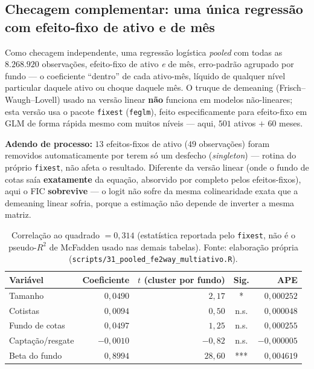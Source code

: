 \documentclass[11pt,a4paper]{article}
\begin{document}
\subsection{Checagem complementar: uma única regressão com efeito-fixo de ativo e de mês}

Como checagem independente, uma regressão logística \emph{pooled} com todas as $8.268.920$
observações, efeito-fixo de ativo \emph{e} de mês, erro-padrão agrupado por fundo --- o
coeficiente ``dentro'' de cada ativo-mês, líquido de qualquer nível particular daquele ativo ou
choque daquele mês. O truque de demeaning (Frisch--Waugh--Lovell) usado na versão linear
\textbf{não} funciona em modelos não-lineares; esta versão usa o pacote \texttt{fixest}
(\texttt{feglm}), feito especificamente para efeito-fixo em GLM de forma rápida mesmo com muitos
níveis --- aqui, $501$ ativos $+$ $60$ meses.

\textbf{Adendo de processo:} $13$ efeitos-fixos de ativo ($49$ observações) foram removidos
automaticamente por terem só um desfecho (\emph{singleton}) --- rotina do próprio
\texttt{fixest}, não afeta o resultado. Diferente da versão linear (onde o fundo de cotas saía
\textbf{exatamente} da equação, absorvido por completo pelos efeitos-fixos), aqui o FIC
\textbf{sobrevive} --- o logit não sofre da mesma colinearidade exata que a demeaning linear
sofria, porque a estimação não depende de inverter a mesma matriz.

\begin{table}[h]\centering\small
\caption{Regressão logística pooled com efeito-fixo de ativo e de mês (8.268.871 obs., 488
ativos, 60 meses, 2.347 fundos).}
\begin{tabular}{@{}lrrcr@{}}
\toprule
Variável & Coeficiente & $t$ (cluster por fundo) & Sig. & APE \\
\midrule
Tamanho              & $0{,}0490$  & $2{,}17$  & *   & $0{,}000252$ \\
Cotistas             & $0{,}0094$  & $0{,}50$  & n.s. & $0{,}000048$ \\
Fundo de cotas       & $0{,}0497$  & $1{,}25$  & n.s. & $0{,}000255$ \\
Captação/resgate     & $-0{,}0010$ & $-0{,}82$ & n.s. & $-0{,}000005$ \\
Beta do fundo        & $0{,}8994$  & $28{,}60$ & *** & $0{,}004619$ \\
\bottomrule
\end{tabular}
\caption*{\footnotesize Correlação ao quadrado $=0{,}314$ (estatística reportada pelo
\texttt{fixest}, não é o pseudo-$R^2$ de McFadden usado nas demais tabelas). Fonte: elaboração
própria (\texttt{scripts/31\_pooled\_fe2way\_multiativo.R}).}
\end{table}
\end{document}
